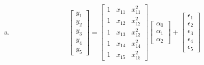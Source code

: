 \documentclass[paper=a4, fontsize=11pt]{scrartcl} %
\begin{document}
\begin{enumerate}[(a)]
\item 
$$
\begin{bmatrix} 
y_1 \\ y_2\\ y_3 \\ y_4 \\ y_5 
\end{bmatrix}
=
\begin{bmatrix} 1 & x_{11} & x_{11}^2 \\1 & x_{12} & x_{12}^2 \\1 & x_{13} & x_{13}^2 \\1 & x_{14} & x_{14}^2 \\1 & x_{15} & x_{15}^2 \end{bmatrix}
\begin{bmatrix} 
\alpha_0 \\ \alpha_1\\ \alpha_2
\end{bmatrix}
+ 
\begin{bmatrix} 
\epsilon_1 \\ \epsilon_2\\ \epsilon_3 \\ \epsilon_4 \\ \epsilon_5 
\end{bmatrix}
$$


\end{enumerate}
\end{document}

